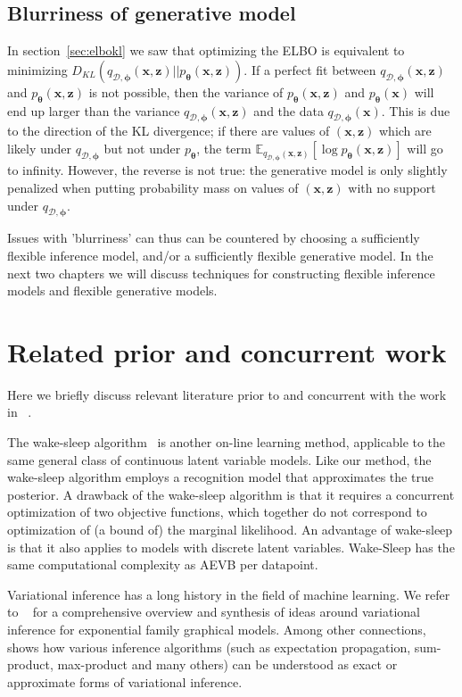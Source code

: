 \documentclass[MAL,biber]{nowfnt} %
\newcommand{\bb}[1]{\mathbf{#1}}
\newcommand{\bx}{\bb{x}}
\newcommand{\bz}{\bb{z}}
\newcommand{\bT}{\boldsymbol{\theta}}
\newcommand{\bphi}{\boldsymbol{\phi}}
\newcommand{\pT}{p_{\bT}}
\newcommand{\qDP}{q_{\mathcal{D},\bphi}}
\newcommand{\Exp}[2]{\mathbb{E}_{#1}\left[#2\right]}
\begin{document}
\subsection{Blurriness of generative model}
In section~\ref{sec:elbokl} we saw that optimizing the ELBO is equivalent to minimizing $D_{KL}(\allowbreak\qDP(\bx,\bz)||\pT(\bx,\bz))$. If a perfect fit between $\qDP(\bx,\bz)$ and $\pT(\bx,\bz)$ is not possible, then the variance of $\pT(\bx,\bz)$ and $\pT(\bx)$ will end up larger than the variance $\qDP(\bx,\bz)$ and the data $\qDP(\bx)$. This is due to the direction of the KL divergence; if there are values of $(\bx,\bz)$ which are likely under $\qDP$ but not under $\pT$, the term $\Exp{\qDP(\bx,\bz)}{\log \pT(\bx,\bz)}$ will go to infinity. However, the reverse is not true: the generative model is only slightly penalized when putting probability mass on values of $(\bx,\bz)$ with no support under $\qDP$.

Issues with 'blurriness' can thus can be countered by choosing a sufficiently flexible inference model, and/or a sufficiently flexible generative model. In the next two chapters we will discuss techniques for constructing flexible inference models and flexible generative models.

\section{Related prior and concurrent work}

Here we briefly discuss relevant literature prior to and concurrent with the work in ~\citep{kingma2013auto}.

The wake-sleep algorithm~\citep{hinton1995wake} is another on-line learning method, applicable to the same general class of continuous latent variable models. Like our method, the wake-sleep algorithm employs a recognition model that approximates the true posterior. A drawback of the wake-sleep algorithm is that it requires a concurrent optimization of two objective functions, which together do not correspond to optimization of (a bound of) the marginal likelihood.
An advantage of wake-sleep is that it also applies to models with discrete latent variables. Wake-Sleep has the same computational complexity as AEVB per datapoint.

Variational inference has a long history in the field of machine learning. We refer to ~\citep{wainwright2008graphical} for a comprehensive overview and synthesis of ideas around variational inference for exponential family graphical models. Among other connections, ~\citep{wainwright2008graphical} shows how various inference algorithms (such as expectation propagation, sum-product, max-product and many others) can be understood as exact or approximate forms of variational inference.
\end{document}
